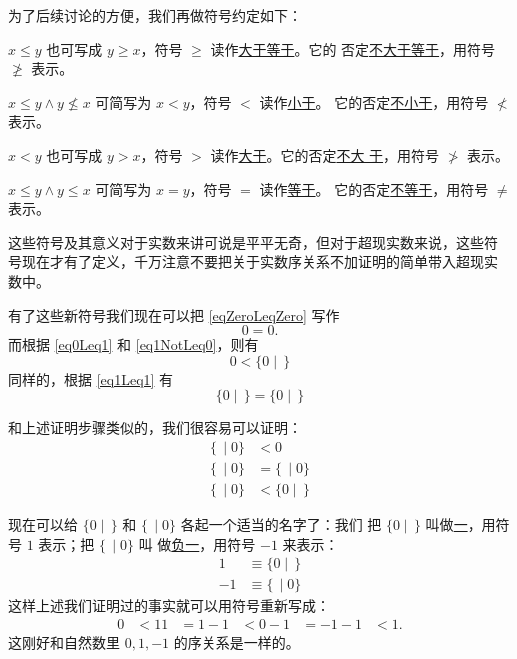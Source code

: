 \documentclass[cs4size,a4paper,adobefonts]{ctexart}
\newcommand{\pname}[1]{\underline{#1}}
\numberwithin{equation}{section}
\begin{document}
为了后续讨论的方便，我们再做符号约定如下：
\begin{symbolDef}
  $x\leq y$ 也可写成 $y\geq x$，符号 $\geq$ 读作\pname{大于等于}。它的
  否定\pname{不大于等于}，用符号 $\ngeq$ 表示。

  $x\leq y\wedge y\nleq x$ 可简写为 $x<y$，符号 $<$ 读作\pname{小于}。
  它的否定\pname{不小于}，用符号 $\nless$ 表示。

  $x<y$ 也可写成 $y>x$，符号 $>$ 读作\pname{大于}。它的否定\pname{不大
    于}，用符号 $\ngtr$ 表示。

  $x\leq y \wedge y \leq x$ 可简写为 $x=y$，符号 $=$ 读作\pname{等于}。
  它的否定\pname{不等于}，用符号 $\neq$ 表示。
\end{symbolDef}

这些符号及其意义对于实数来讲可说是平平无奇，但对于超现实数来说，这些符
号现在才有了定义，千万注意不要把关于实数序关系不加证明的简单带入超现实
数中。

有了这些新符号我们现在可以把 \eqref{eqZeroLeqZero} 写作
\begin{equation}
  0=0.
\end{equation}
而根据 \eqref{eq0Leq1} 和 \eqref{eq1NotLeq0}，则有
\begin{equation}
  0 < \{0\mid\,\}
\end{equation}
同样的，根据 \eqref{eq1Leq1} 有
\begin{equation}
  \{0\mid\,\}=\{0\mid\,\}
\end{equation}

和上述证明步骤类似的，我们很容易可以证明：
\begin{align}
  \{\,\mid 0\} &< 0\\
  \{\,\mid 0\} &= \{\,\mid 0\}\\
  \{\,\mid 0\} &< \{0\mid \,\}
\end{align}

现在可以给 $\{0\mid \,\}$ 和 $\{\,\mid 0\}$ 各起一个适当的名字了：我们
把 $\{0\mid \,\}$ 叫做\pname{一}，用符号 $1$ 表示；把 $\{\,\mid 0\}$ 叫
做\pname{负一}，用符号 $-1$ 来表示：
\begin{align}
  1 &\equiv \{0\mid \,\}\\
  -1 &\equiv \{\,\mid 0\}
\end{align}
这样上述我们证明过的事实就可以用符号重新写成：
\begin{align}
  0 & < 1
  1 & = 1
  -1 & < 0
  -1 & = -1
  -1 & < 1.
\end{align}
这刚好和自然数里 $0,1,-1$ 的序关系是一样的。
\end{document}
